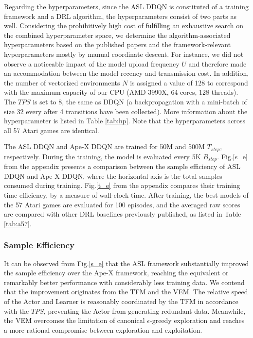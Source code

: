 \documentclass[journal]{IEEEtran}
\begin{document}
Regarding the hyperparameters, since the ASL DDQN is constituted of a training framework and a DRL algorithm, the hyperparameters consist of two parts as well. Considering the prohibitively high cost of fulfilling an exhaustive search on the combined hyperparameter space, we determine the algorithm-associated hyperparameters based on the published papers and the framework-relevant hyperparameters mostly by manual coordinate descent. For instance, we did not observe a noticeable impact of the model upload frequency $U$ and therefore made an accommodation between the model recency and transmission cost. In addition, the number of vectorized environments $N$ is assigned a value of 128 to correspond with the maximum capacity of our CPU (AMD 3990X, 64 cores, 128 threads). The $TPS$ is set to 8, the same as DDQN (a backpropagation with a mini-batch of size 32 every after 4 transitions have been collected). More information about the hyperparameter is listed in Table \ref{tab:hp}. Note that the hyperparameters across all 57 Atari games are identical.

The ASL DDQN and Ape-X DDQN are trained for 50M and 500M $T_{step}$, respectively. During the training, the model is evaluated every 5K $B_{step}$. Fig.\ref{s_e} from the appendix presents a comparison between the sample efficiency of ASL DDQN and Ape-X DDQN, where the horizontal axis is the total samples consumed during training. Fig.\ref{t_e} from the appendix compares their training time efficiency, by a measure of wall-clock time. After training, the best models of the 57 Atari games are evaluated for 100 episodes, and the averaged raw scores are compared with other DRL baselines previously published, as listed in Table \ref{tab:a57}. 

\subsubsection{Sample Efficiency}
It can be observed from Fig.\ref{s_e} that the ASL framework substantially improved the sample efficiency over the Ape-X framework, reaching the equivalent or remarkably better performance with considerably less training data. We contend that the improvement originates from the TFM and the VEM. The relative speed of the Actor and Learner is reasonably coordinated by the TFM in accordance with the $TPS$, preventing the Actor from generating redundant data. Meanwhile, the VEM overcomes the limitation of canonical $\epsilon$-greedy exploration and reaches a more rational compromise between exploration and exploitation.
\end{document}
